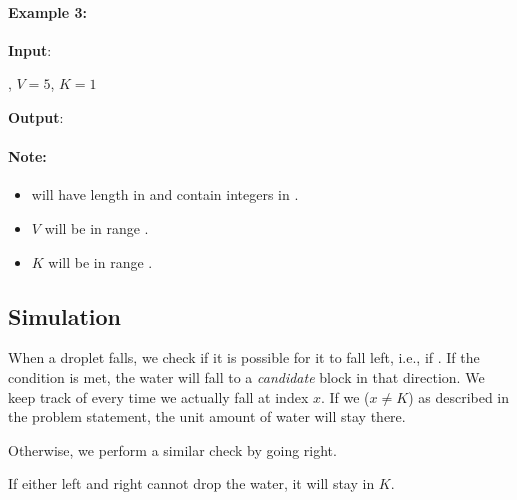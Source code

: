 \paragraph{Example 3:}
\begin{flushleft}


\textbf{Input}: 

, $V = 5$, $K = 1$

\textbf{Output}: \fcj{[4,4,4]}
\end{flushleft}
\paragraph{Note:}

\begin{itemize}
\item {} will have length in \fcj{[1, 100]} and contain integers in \fcj{[0, 99]}.
\item $V$ will be in range \fcj{[0, 2000]}.
\item $K$ will be in range .
\end{itemize}

\subsection{Simulation}
When a droplet falls, we check if it is possible for it to fall left, i.e., if . If the condition is met, the water will fall to a \textit{candidate} block in that direction. We keep track of every time we actually fall at index $x$. If we  ($x\neq K$) as described in the problem statement, the unit amount of water will stay there. 

Otherwise, we perform a similar check by going right.

If either left and right cannot drop the water, it will stay in $K$.

